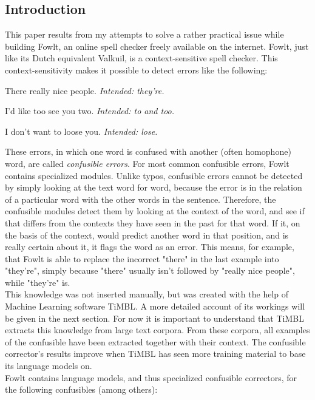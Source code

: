 \documentclass[12pt]{article}
\begin{document}

\subsection{Introduction}

This paper results from my attempts to solve a rather practical issue while building Fowlt, an online spell checker freely available on the internet. Fowlt, just like its Dutch equivalent Valkuil, is a context-sensitive spell checker. This context-sensitivity makes it possible to detect errors like the following:

\begin{examples}

\item There really nice people. \emph{Intended: they're.}
\item I'd like too see you two. \emph{Intended: to and too.}
\item I don't want to loose you. \emph{Intended: lose.}

\end{examples}

These errors, in which one word is confused with another (often homophone) word, are called \emph{confusible errors}. For most common confusible errors, Fowlt contains specialized modules. Unlike typos, confusible errors cannot be detected by simply looking at the text word for word, because the error is in the relation of a particular word with the other words in the sentence. Therefore, the confusible modules detect them by looking at the context of the word, and see if that differs from the contexts they have seen in the past for that word. If it, on the basis of the context, would predict another word in that position, and is really certain about it, it flags the word as an error. This means, for example, that Fowlt is able to replace the incorrect "there" in the last example into "they're", simply because "there" usually isn't followed by "really nice people", while "they're" is. \\\indent
This knowledge was not inserted manually, but was created with the help of Machine Learning software TiMBL. A more detailed account of its workings will be given in the next section. For now it is important to understand that TiMBL extracts this knowledge from large text corpora. From these corpora, all examples of the confusible have been extracted together with their context. The confusible corrector's results improve when TiMBL has seen more training material to base its language models on.\\\indent
Fowlt contains language models, and thus specialized confusible correctors, for the following confusibles (among others):
\end{document}
